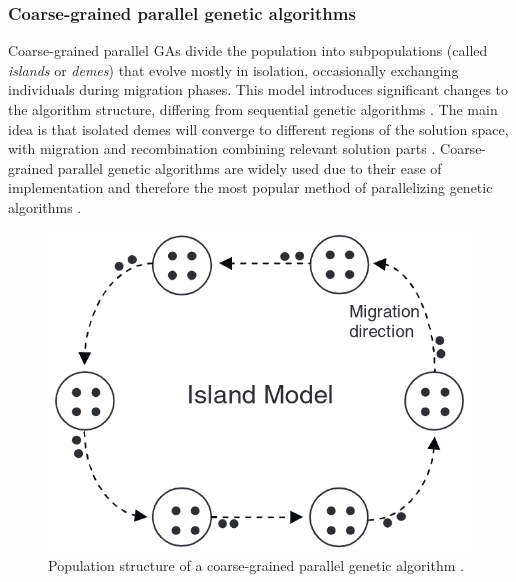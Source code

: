 \documentclass[sigconf]{acmart}
\begin{document}
\subsubsection*{Coarse-grained parallel genetic algorithms}
Coarse-grained parallel GAs divide the population into subpopulations
(called \textit{islands} or \textit{demes}) that evolve mostly in isolation,
occasionally exchanging individuals during migration phases.
This model introduces significant changes to the algorithm structure,
differing from sequential genetic algorithms \cite{Affenzeller2009}.
The main idea is that isolated demes will converge to different regions of the
solution space, with migration and recombination combining relevant solution
parts \cite{Affenzeller2009}.
Coarse-grained parallel genetic algorithms are widely used due to their
ease of implementation and therefore the most popular method of
parallelizing genetic algorithms \cite{Affenzeller2009}.
\begin{figure}[h]
  \includegraphics[scale=0.24]{assets/parallel-ga-coarse.png}
  \caption{
    Population structure of a coarse-grained parallel genetic algorithm
    \cite{Affenzeller2009}.
  }
\end{figure}
\end{document}
